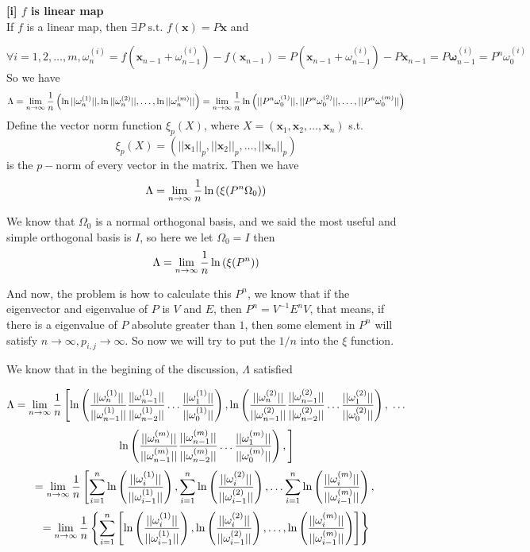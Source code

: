 \documentclass[12pt]{article}
\theoremstyle{plain}
\begin{document}
\textbf{[i] $f$ is linear map}
\\\noindent If $f$ is a linear map, then $\exists P \text{ s.t. } f(\mathbf x) = P\mathbf x$ and 

$$
\forall i = 1, 2, \ldots, m, \omega^{(i)}_n = f(\mathbf x_{n-1} + \omega^{(i)}_{n-1}) - f(\mathbf x_{n-1}) = P(\mathbf x_{n-1} + \omega^{(i)}_{n-1}) - P\mathbf x_{n-1}= P\mathbf \omega^{(i)}_{n-1} = P^{n} \omega^{(i)}_0
$$
So we have 
$$
\Lambda 
= \lim_{n \rightarrow \infty}{1\over n}\left(\ln{||\omega^{(1)}_n|| }, \ln{||\omega^{(2)}_n|| }, \ldots, \ln{||\omega^{(m)}_n|| }\right)
= \lim_{n \rightarrow \infty}{1\over n}\ln\left({||P^n\omega^{(1)}_0|| }, {||P^n\omega^{(2)}_0|| }, \ldots, {||P^n\omega^{(m)}_0|| }\right)
$$
Define the vector norm function $\xi_p(X)$, where $X = (\mathbf x_1, \mathbf x_2, \ldots, \mathbf x_n)$ s.t.
$$
\xi_p(X) = \left(||\mathbf x_1||_p, ||\mathbf x_2||_p, \ldots, ||\mathbf x_n||_p\right)
$$
is the $p-$norm of every vector in the matrix. Then we have 
$$
\Lambda = \lim_{n \rightarrow \infty}{1\over n}\ln\left(\xi(P^n\Omega_0)\right)
$$

We know that $\Omega_0$ is a normal orthogonal basis, and we said the most useful and simple orthogonal basis is $I$, so here we let $\Omega_0 = I$ then 
$$
\Lambda = \lim_{n \rightarrow \infty}{1\over n}\ln\left(\xi(P^n)\right)
$$

And now, the problem is how to calculate this $P^n$, we know that if the eigenvector and eigenvalue of $P$ is $V$ and $E$, then $P^n = V^{-1} E^n V$, that means, if there is a eigenvalue of $P$ absolute greater than $1$, then some element in $P^n$ will satisfy $n \rightarrow \infty, p_{i,j} \rightarrow \infty$. So now we will try to put the $1/n$ into the $\xi$ function.

We know that in the begining of the discussion, $\Lambda$ satisfied

$$
\Lambda 
= \lim_{n \rightarrow \infty}{1\over n}\left[
\ln\left({||\omega^{(1)}_n|| \over ||\omega^{(1)}_{n-1}||}
         {||\omega^{(1)}_{n-1}|| \over ||\omega^{(1)}_{n-2}||}
         \ldots
         {||\omega^{(1)}_1|| \over ||\omega^{(1)}_0||}
\right), 
\ln\left({||\omega^{(2)}_n|| \over ||\omega^{(2)}_{n-1}||}
         {||\omega^{(2)}_{n-1}|| \over ||\omega^{(2)}_{n-2}||}
         \ldots
         {||\omega^{(2)}_1|| \over ||\omega^{(2)}_0||}
\right), \right.
\ldots
$$
$$
\left.
\ln\left({||\omega^{(m)}_n|| \over ||\omega^{(m)}_{n-1}||}
         {||\omega^{(m)}_{n-1}|| \over ||\omega^{(m)}_{n-2}||}
         \ldots
         {||\omega^{(m)}_1|| \over ||\omega^{(m)}_0||}
\right), 
\right]
$$
$$
= \lim_{n \rightarrow \infty}{1\over n}\left[
\sum_{i = 1}^{n}\ln\left({||\omega^{(1)}_i|| \over ||\omega^{(1)}_{i-1}||}\right), 
\sum_{i = 1}^{n}\ln\left({||\omega^{(2)}_i|| \over ||\omega^{(2)}_{i-1}||}\right), 
\ldots
\sum_{i = 1}^{n}\ln\left({||\omega^{(m)}_i|| \over ||\omega^{(m)}_{i-1}||}\right), 
\right.
$$
$$
= \lim_{n \rightarrow \infty}{1\over n}\left\{
\sum_{i = 1}^{n}
\left[
\ln\left({||\omega^{(1)}_i|| \over ||\omega^{(1)}_{i-1}||}\right),
\ln\left({||\omega^{(2)}_i|| \over ||\omega^{(2)}_{i-1}||}\right),
\ldots,
\ln\left({||\omega^{(m)}_i|| \over ||\omega^{(m)}_{i-1}||}\right)
\right]\right\}
$$
\end{document}
